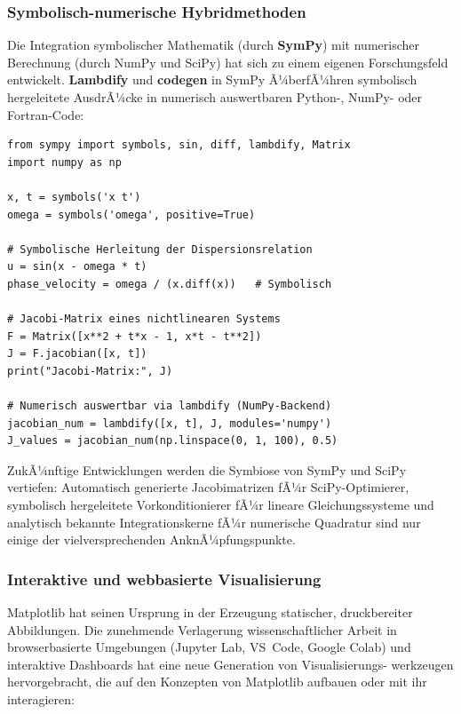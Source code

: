 \documentclass[12pt, a4paper]{article}
\begin{document}
\subsubsection{Symbolisch-numerische Hybridmethoden}
\label{subsubsec:sympy}

Die Integration symbolischer Mathematik (durch \textbf{SymPy}) mit
numerischer Berechnung (durch NumPy und SciPy) hat sich zu einem eigenen
Forschungsfeld entwickelt. \textbf{Lambdify} und \textbf{codegen} in SymPy
Ã¼berfÃ¼hren symbolisch hergeleitete AusdrÃ¼cke in numerisch auswertbaren
Python-, NumPy- oder Fortran-Code:

\begin{lstlisting}[caption={SymPy + NumPy: Symbolisch-numerische Pipeline}]
from sympy import symbols, sin, diff, lambdify, Matrix
import numpy as np

x, t = symbols('x t')
omega = symbols('omega', positive=True)

# Symbolische Herleitung der Dispersionsrelation
u = sin(x - omega * t)
phase_velocity = omega / (x.diff(x))   # Symbolisch

# Jacobi-Matrix eines nichtlinearen Systems
F = Matrix([x**2 + t*x - 1, x*t - t**2])
J = F.jacobian([x, t])
print("Jacobi-Matrix:", J)

# Numerisch auswertbar via lambdify (NumPy-Backend)
jacobian_num = lambdify([x, t], J, modules='numpy')
J_values = jacobian_num(np.linspace(0, 1, 100), 0.5)
\end{lstlisting}

ZukÃ¼nftige Entwicklungen werden die Symbiose von SymPy und SciPy
vertiefen: Automatisch generierte Jacobimatrizen fÃ¼r SciPy-Optimierer,
symbolisch hergeleitete Vorkonditionierer fÃ¼r lineare Gleichungssysteme
und analytisch bekannte Integrationskerne fÃ¼r numerische Quadratur sind
nur einige der vielversprechenden AnknÃ¼pfungspunkte.

\subsubsection{Interaktive und webbasierte Visualisierung}
\label{subsubsec:interactive-viz}

Matplotlib hat seinen Ursprung in der Erzeugung statischer,
druckbereiter Abbildungen. Die zunehmende Verlagerung wissenschaftlicher
Arbeit in browserbasierte Umgebungen (Jupyter Lab, VS~Code, Google Colab)
und interaktive Dashboards hat eine neue Generation von Visualisierungs-
werkzeugen hervorgebracht, die auf den Konzepten von Matplotlib aufbauen
oder mit ihr interagieren:
\end{document}
